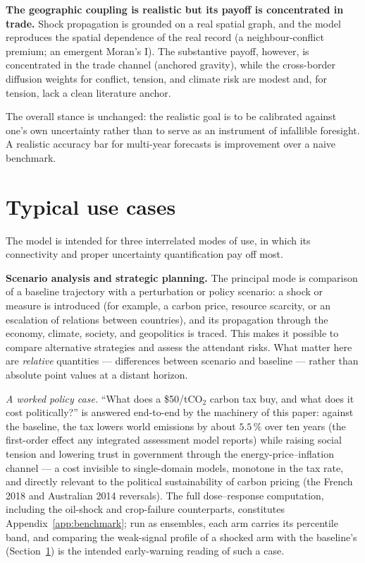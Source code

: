 \documentclass[a4paper,fleqn]{cas-sc}
\begin{document}
\textbf{The geographic coupling is realistic but its payoff is concentrated in trade.} Shock
propagation is grounded on a real spatial graph, and the model reproduces the spatial dependence of the
real record (a neighbour-conflict premium; an emergent Moran's I). The substantive payoff, however, is
concentrated in the trade channel (anchored gravity), while the cross-border diffusion weights for
conflict, tension, and climate risk are modest and, for tension, lack a clean literature anchor.

The overall stance is unchanged: the realistic goal is to be calibrated against one's own
uncertainty rather than to serve as an instrument of infallible foresight. A realistic accuracy bar
for multi-year forecasts is improvement over a naive benchmark.

\section{Typical use cases}
\label{sec:scenarios}

The model is intended for three interrelated modes of use, in which its connectivity and proper
uncertainty quantification pay off most.

\textbf{Scenario analysis and strategic planning.} The principal mode is comparison of a baseline
trajectory with a perturbation or policy scenario: a shock or measure is introduced (for example, a
carbon price, resource scarcity, or an escalation of relations between countries), and its
propagation through the economy, climate, society, and geopolitics is traced. This makes it possible
to compare alternative strategies and assess the attendant risks. What matter here are
\emph{relative} quantities --- differences between scenario and baseline --- rather than absolute
point values at a distant horizon.

\emph{A worked policy case.} ``What does a \$50/tCO$_2$ carbon tax buy, and what does it cost
politically?'' is answered end-to-end by the machinery of this paper: against the baseline, the
tax lowers world emissions by about $5.5\,\%$ over ten years (the first-order effect any integrated
assessment model reports) while raising social tension and lowering trust in government through
the energy-price--inflation channel --- a cost invisible to single-domain models, monotone in the
tax rate, and directly relevant to the political sustainability of carbon pricing (the French 2018
and Australian 2014 reversals). The full dose--response computation, including the oil-shock and
crop-failure counterparts, constitutes Appendix~\ref{app:benchmark}; run as ensembles, each arm
carries its percentile band, and comparing the weak-signal profile of a shocked arm with the
baseline's (Section~\ref{sec:scenarios}) is the intended early-warning reading of such a case.
\end{document}
